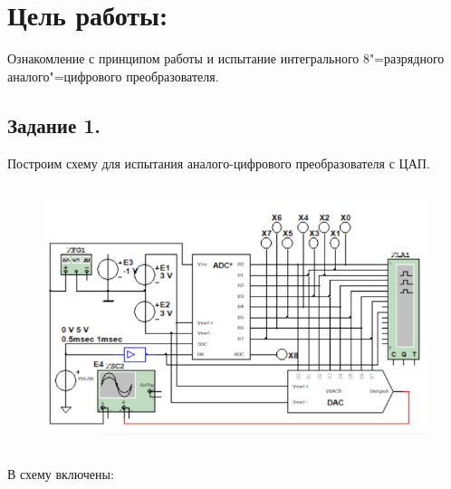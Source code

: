 \documentclass[spec, och, labwork]{shiza}
\begin{document}

\section*{Цель работы:}

Ознакомление с принципом работы и испытание интегрального 8"=разрядного
аналого"=цифрового преобразователя.

\subsection*{Задание 1.}

Построим схему для испытания аналого-цифрового преобразователя с ЦАП.

\begin{figure}[H]
    \centering
    \includegraphics[width=4.96458in,height=3.03706in]{image1.png}
\end{figure}

В схему включены:
\end{document}
